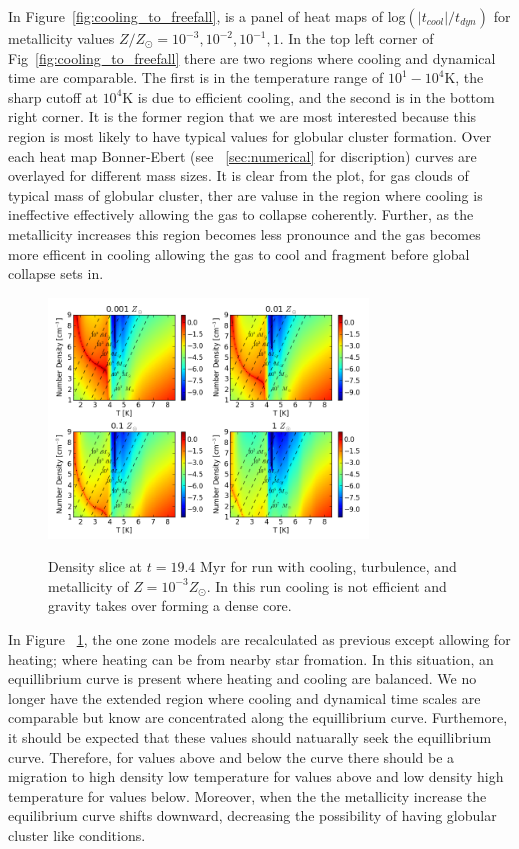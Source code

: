 \documentclass[useAMS,usenatbib]{mn2e}
\begin{document}
In Figure~\ref{fig:cooling_to_freefall}, is a panel of heat maps of log$(|t_{cool}|/t_{dyn})$
for metallicity values $Z/Z_{\odot}=10^{-3},10^{-2},10^{-1},1$. In the top left corner of Fig~\ref{fig:cooling_to_freefall}
there are two regions where cooling and dynamical time are comparable. The first is in the temperature range of
$10^1-10^4$K, the sharp cutoff at $10^4$K is due to efficient cooling, and the second is in the bottom right
corner. It is the former region that we are most interested because this region is most likely to have
typical values for globular cluster formation. Over each heat map Bonner-Ebert (see ~\ref{sec:numerical} for discription) curves
are overlayed for different mass sizes. It is clear from the plot, for gas clouds of typical mass of globular cluster, ther are 
valuse in the region where cooling is ineffective effectively allowing the gas to collapse coherently. Further, as the metallicity
increases this region becomes less pronounce and the gas becomes more efficent in cooling allowing the gas to cool and fragment
before global collapse sets in.
\begin{figure}
\begin{center}
\mbox{\includegraphics[width=8.5cm]{Images/cooling_to_freefall}}
\end{center}
\caption{\label{fig:cooling_to_freefall_background}} Density slice at $t=19.4$ Myr for run with
cooling, turbulence, and metallicity of $Z=10^{-3}Z_\odot$. In this run cooling is
not efficient and gravity takes over forming a dense core. 
\end{figure}

In Figure ~\ref{fig:cooling_to_freefall_background}, the one zone models are recalculated as previous except allowing
for heating; where heating can be from nearby star fromation. In this situation, an equillibrium curve is present where
heating and cooling are balanced. We no longer have the extended region where cooling and dynamical time scales are 
comparable but know are concentrated along the equillibrium curve. Furthemore, it should be expected that these values should
natuarally seek the equillibrium curve. Therefore, for values above and below the curve there should be a migration
to high density low temperature for values above and low density high temperature for values below. Moreover, when the
the metallicity increase the equilibrium curve shifts downward, decreasing the possibility of having globular cluster
like conditions.
\end{document}
